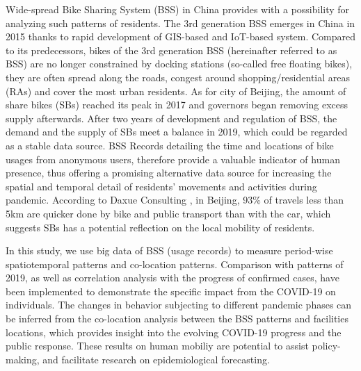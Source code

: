 \documentclass[preprints,ijgi,submit,moreauthors]{Definitions/mdpi}
\begin{document}
Wide-spread Bike Sharing System (BSS) in China provides with a possibility for analyzing such patterns of residents.
The 3rd generation BSS emerges in China in 2015 thanks to rapid development of GIS-based and IoT-based system. 
Compared to its predecessors, bikes of the 3rd generation BSS (hereinafter referred to as BSS) are no longer constrained by docking stations (so-called free floating bikes), they are often spread along the roads, congest around shopping/residential areas (RAs) and cover the most urban residents. 
As for city of Beijing, the amount of share bikes (SBs) reached its peak in 2017 and governors began removing excess supply afterwards. 
After two years of development and regulation of BSS, the demand and the supply of SBs meet a balance in 2019, which could be regarded as a stable data source.
BSS Records detailing the time and locations of bike usages from anonymous users, therefore provide a valuable indicator of human presence, thus offering a promising alternative data source for increasing the spatial and temporal detail of residents' movements and activities during pandemic.
According to Daxue Consulting \cite{bssmodel}, in Beijing, 93\% of travels less than 5km are quicker done by bike and public transport than with the car, which suggests SBs has a potential reflection on the local mobility of residents.

In this study, we use big data of BSS (usage records) to measure period-wise spatiotemporal patterns and co-location patterns. 
Comparison with patterns of 2019, as well as correlation analysis with the progress of confirmed cases, have been implemented to demonstrate the specific impact from the COVID-19 on individuals.
The changes in behavior subjecting to different pandemic phases can be inferred from the co-location analysis between the BSS patterns and facilities locations, which provides insight into the evolving COVID-19 progress and the public response.  
These results on human mobiliy are potential to assist policy-making, and facilitate research on epidemiological forecasting.
\end{document}
